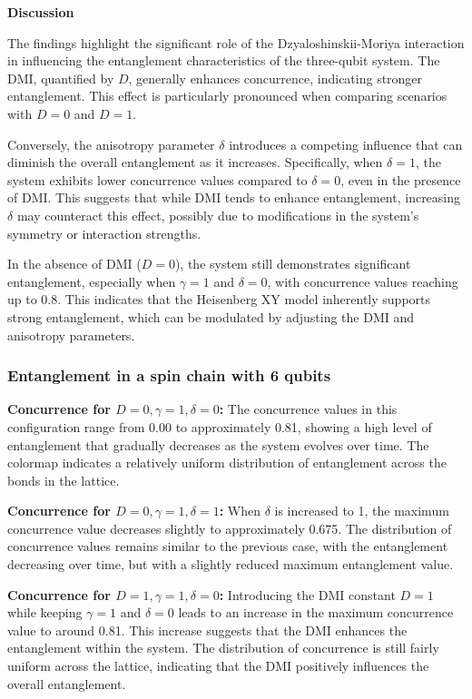 \newpage
\textbf{Discussion}

The findings highlight the significant role of the Dzyaloshinskii-Moriya interaction in influencing the entanglement characteristics of the three-qubit system. The DMI, quantified by \(D\), generally enhances concurrence, indicating stronger entanglement. This effect is particularly pronounced when comparing scenarios with \(D = 0\) and \(D = 1\).

Conversely, the anisotropy parameter \(\delta\) introduces a competing influence that can diminish the overall entanglement as it increases. Specifically, when \(\delta = 1\), the system exhibits lower concurrence values compared to \(\delta = 0\), even in the presence of DMI. This suggests that while DMI tends to enhance entanglement, increasing \(\delta\) may counteract this effect, possibly due to modifications in the system's symmetry or interaction strengths.

In the absence of DMI (\(D = 0\)), the system still demonstrates significant entanglement, especially when \(\gamma = 1\) and \(\delta = 0\), with concurrence values reaching up to 0.8. This indicates that the Heisenberg XY model inherently supports strong entanglement, which can be modulated by adjusting the DMI and anisotropy parameters.




\newpage
\subsubsection{Entanglement in a spin chain with 6 qubits}
\textbf{Concurrence for \( D = 0, \gamma = 1, \delta = 0 \):} 
The concurrence values in this configuration range from 0.00 to approximately 0.81, showing a high level of entanglement that gradually decreases as the system evolves over time. The colormap indicates a relatively uniform distribution of entanglement across the bonds in the lattice.


\textbf{Concurrence for \( D = 0, \gamma = 1, \delta = 1 \):} 
When \(\delta\) is increased to 1, the maximum concurrence value decreases slightly to approximately 0.675. The distribution of concurrence values remains similar to the previous case, with the entanglement decreasing over time, but with a slightly reduced maximum entanglement value.


\textbf{Concurrence for \( D = 1, \gamma = 1, \delta = 0 \):} 
Introducing the DMI constant \(D = 1\) while keeping \(\gamma = 1\) and \(\delta = 0\) leads to an increase in the maximum concurrence value to around 0.81. This increase suggests that the DMI enhances the entanglement within the system. The distribution of concurrence is still fairly uniform across the lattice, indicating that the DMI positively influences the overall entanglement.


